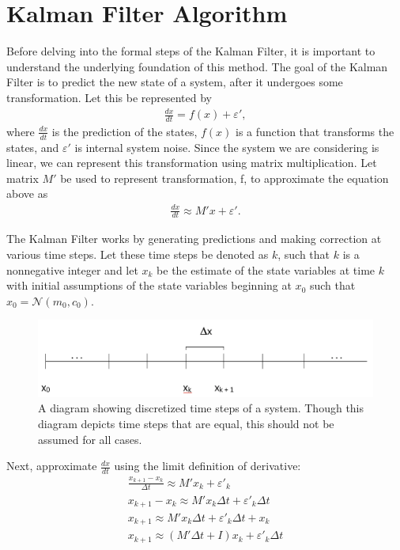 \newpage

\section{Kalman Filter Algorithm}

Before  delving into the formal steps of the Kalman Filter, it is important to understand the underlying foundation of this method. 
\noindent The goal of the Kalman Filter is to predict the new state of a system, after it undergoes some transformation. Let this be represented by 
\begin{align*}
	\frac{dx}{dt} = f(x) + \varepsilon ',
\end{align*}
where $\frac{dx}{dt}$ is the prediction of the states, $f(x)$ is a function that transforms the states, and $ \varepsilon '$ is internal system noise. Since the system we are considering is linear, we can represent this transformation using matrix multiplication. Let matrix $M'$ be used to represent transformation, f, to approximate the equation above as
\begin{align*}
	\frac{dx}{dt} \approx M'x + \varepsilon '.
\end{align*}

\noindent The Kalman Filter works by generating predictions and making correction at various time steps. Let these time steps be denoted as $k$, such that $ k $ is a nonnegative integer and let $x_k$ be the estimate of the state variables at time $k$ with initial assumptions of the state variables beginning at $x_0$ such that $x_0 = \mathcal{N}(m_0, c_0) $. 

\begin{figure}[h]
    \centering
    \includegraphics[scale = 0.3]{kgraph.png}
    \caption{A diagram showing discretized time steps of a system. Though this diagram depicts time steps that are equal, this should not be assumed for all cases.}
\end{figure}

\noindent Next, approximate $\frac{dx}{dt}$ using the limit definition of derivative:
\begin{align*}
	\frac{x_{k+1} - x_k}{\Delta t} \approx M'x_k + \varepsilon '_k \\
	x_{k+1} - x_k \approx M'x_k \Delta t + \varepsilon '_k  \Delta t \\
	x_{k+1} \approx M'x_k \Delta t + \varepsilon '_k  \Delta t + x_k \\
	x_{k+1} \approx (M' \Delta t + I)x_k + \varepsilon '_k  \Delta t
\end{align*}


